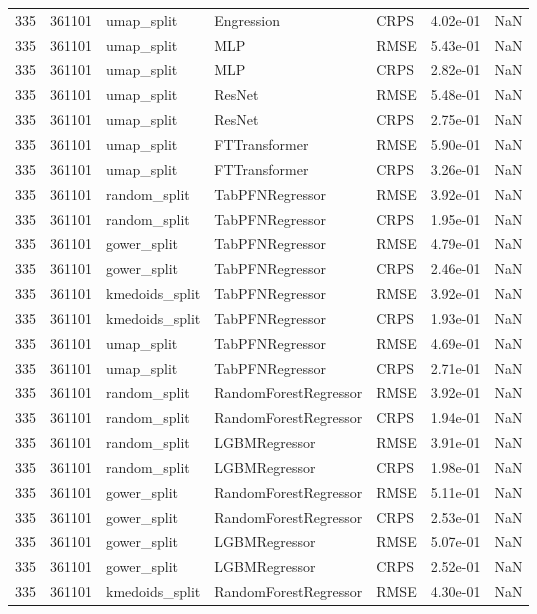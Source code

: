 \begin{tabular}{rrlllrr}
335 & 361101 & umap\_split & Engression & CRPS & 4.02e-01 & NaN \\
335 & 361101 & umap\_split & MLP & RMSE & 5.43e-01 & NaN \\
335 & 361101 & umap\_split & MLP & CRPS & 2.82e-01 & NaN \\
335 & 361101 & umap\_split & ResNet & RMSE & 5.48e-01 & NaN \\
335 & 361101 & umap\_split & ResNet & CRPS & 2.75e-01 & NaN \\
335 & 361101 & umap\_split & FTTransformer & RMSE & 5.90e-01 & NaN \\
335 & 361101 & umap\_split & FTTransformer & CRPS & 3.26e-01 & NaN \\
335 & 361101 & random\_split & TabPFNRegressor & RMSE & 3.92e-01 & NaN \\
335 & 361101 & random\_split & TabPFNRegressor & CRPS & 1.95e-01 & NaN \\
335 & 361101 & gower\_split & TabPFNRegressor & RMSE & 4.79e-01 & NaN \\
335 & 361101 & gower\_split & TabPFNRegressor & CRPS & 2.46e-01 & NaN \\
335 & 361101 & kmedoids\_split & TabPFNRegressor & RMSE & 3.92e-01 & NaN \\
335 & 361101 & kmedoids\_split & TabPFNRegressor & CRPS & 1.93e-01 & NaN \\
335 & 361101 & umap\_split & TabPFNRegressor & RMSE & 4.69e-01 & NaN \\
335 & 361101 & umap\_split & TabPFNRegressor & CRPS & 2.71e-01 & NaN \\
335 & 361101 & random\_split & RandomForestRegressor & RMSE & 3.92e-01 & NaN \\
335 & 361101 & random\_split & RandomForestRegressor & CRPS & 1.94e-01 & NaN \\
335 & 361101 & random\_split & LGBMRegressor & RMSE & 3.91e-01 & NaN \\
335 & 361101 & random\_split & LGBMRegressor & CRPS & 1.98e-01 & NaN \\
335 & 361101 & gower\_split & RandomForestRegressor & RMSE & 5.11e-01 & NaN \\
335 & 361101 & gower\_split & RandomForestRegressor & CRPS & 2.53e-01 & NaN \\
335 & 361101 & gower\_split & LGBMRegressor & RMSE & 5.07e-01 & NaN \\
335 & 361101 & gower\_split & LGBMRegressor & CRPS & 2.52e-01 & NaN \\
335 & 361101 & kmedoids\_split & RandomForestRegressor & RMSE & 4.30e-01 & NaN \\

\end{tabular}
